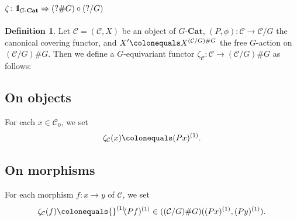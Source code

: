 \documentclass{surv-l}
\numberwithin{equation}{chapter}
\numberwithin{figure}{chapter}
\theoremstyle{plain}
\theoremstyle{definition}
\newtheorem{dfn}[thm]{Definition}
\theoremstyle{remark}
\newcommand{\id}{1\kern-.25em{\text{{\rm l}}}}
\newcommand{\GCat}{G\text{-}\mathbf{Cat}}
\def\smor(#1,#2,#3){{}^{(#1)}\!#2^{(#3)}}
\begin{document}
\subsection{$\zeta\colon\id_{G\text{-}\mathbf{Cat}}\Rightarrow (?\#G) \circ (?/G)$}

\begin{dfn}
\label{dfn:ep}
Let ${\mathcal{C}} = ({\mathcal{C}}, X)$ be an object of $\GCat$,
$(P,\phi)\colon{\mathcal{C}}\to{\mathcal{C}}/G$ the canonical covering functor, and
$X'\colonequals  X^{({\mathcal{C}}/G)\# G}$ the free $G$-action on $({\mathcal{C}}/G)\# G$.
Then we define a $G$-equivariant functor $\zeta_{{\mathcal{C}}}\colon{\mathcal{C}}\to({\mathcal{C}}/G)\#G$
as follows:

\subsection*{On objects} For each $x\in{\mathcal{C}}_0$, we set
\[
\zeta_{{\mathcal{C}}}(x)\colonequals (Px)^{(1)}.
\]

\subsection*{On morphisms} For each morphism $f\colon x\to y$ of ${\mathcal{C}}$,
we set
\begin{equation}\label{eq:ep-P}
\zeta_{{\mathcal{C}}}(f)\colonequals  \smor(1,(Pf),1) \in (({\mathcal{C}}/G)\# G)((Px)^{(1)}, (Py)^{(1)}).
\end{equation}


\end{dfn}
\end{document}
